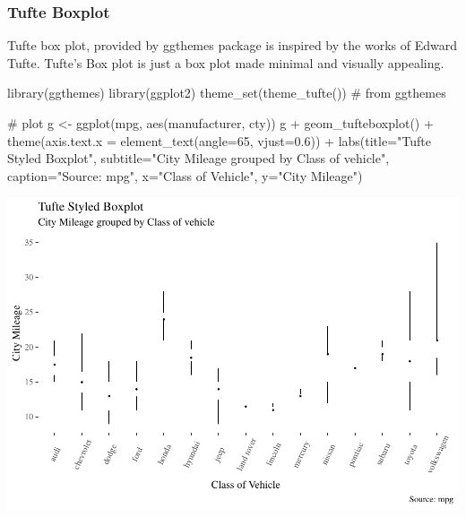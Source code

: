 \documentclass[a4paper]{article}
\newenvironment{Shaded}{}{}
\newcommand{\KeywordTok}[1]{\textcolor[rgb]{0.00,0.00,1.00}{#1}}
\newcommand{\DataTypeTok}[1]{#1}
\newcommand{\DecValTok}[1]{#1}
\newcommand{\FloatTok}[1]{#1}
\newcommand{\StringTok}[1]{\textcolor[rgb]{0.00,0.50,0.50}{#1}}
\newcommand{\CommentTok}[1]{\textcolor[rgb]{0.00,0.50,0.00}{#1}}
\newcommand{\OperatorTok}[1]{#1}
\newcommand{\NormalTok}[1]{#1}
\begin{document}
\newpage  

\subsubsection{Tufte Boxplot}\label{tufte-boxplot}

Tufte box plot, provided by ggthemes package is inspired by the works of
Edward Tufte. Tufte's Box plot is just a box plot made minimal and
visually appealing.

\begin{Shaded}
\begin{Highlighting}[]
\KeywordTok{library}\NormalTok{(ggthemes)}
\KeywordTok{library}\NormalTok{(ggplot2)}
\KeywordTok{theme_set}\NormalTok{(}\KeywordTok{theme_tufte}\NormalTok{())  }\CommentTok{# from ggthemes}

\CommentTok{# plot}
\NormalTok{g <-}\StringTok{ }\KeywordTok{ggplot}\NormalTok{(mpg, }\KeywordTok{aes}\NormalTok{(manufacturer, cty))}
\NormalTok{g }\OperatorTok{+}\StringTok{ }\KeywordTok{geom_tufteboxplot}\NormalTok{() }\OperatorTok{+}\StringTok{ }
\StringTok{      }\KeywordTok{theme}\NormalTok{(}\DataTypeTok{axis.text.x =} \KeywordTok{element_text}\NormalTok{(}\DataTypeTok{angle=}\DecValTok{65}\NormalTok{, }\DataTypeTok{vjust=}\FloatTok{0.6}\NormalTok{)) }\OperatorTok{+}\StringTok{ }
\StringTok{      }\KeywordTok{labs}\NormalTok{(}\DataTypeTok{title=}\StringTok{"Tufte Styled Boxplot"}\NormalTok{, }
           \DataTypeTok{subtitle=}\StringTok{"City Mileage grouped by Class of vehicle"}\NormalTok{,}
           \DataTypeTok{caption=}\StringTok{"Source: mpg"}\NormalTok{,}
           \DataTypeTok{x=}\StringTok{"Class of Vehicle"}\NormalTok{,}
           \DataTypeTok{y=}\StringTok{"City Mileage"}\NormalTok{)}
\end{Highlighting}
\end{Shaded}

\includegraphics{M24-ggplot2_Gallery_files/figure-latex/unnamed-chunk-29-1.pdf}
\end{document}
